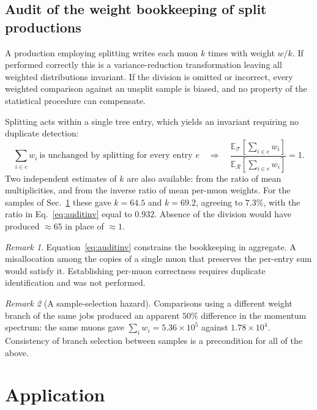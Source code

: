 \documentclass[11pt,a4paper]{article}
\theoremstyle{definition}
\theoremstyle{plain}
\theoremstyle{remark}
\newtheorem{remark}{Remark}[section]
\newcommand{\Rr}{\mathcal{R}}
\newcommand{\Tt}{\mathcal{T}}
\newcommand{\Exp}{\mathbb{E}}
\begin{document}
\subsection{Audit of the weight bookkeeping of split productions}
\label{sec:audit}

A production employing splitting writes each muon $k$ times with weight $w/k$.
If performed correctly this is a variance-reduction transformation leaving all
weighted distributions invariant. If the division is omitted or incorrect, every
weighted comparison against an unsplit sample is biased, and no property of the
statistical procedure can compensate.

Splitting acts within a single tree entry, which yields an invariant requiring
no duplicate detection:
\begin{equation}
  \sum_{i \in e} w_i \ \text{is unchanged by splitting for every entry } e
  \quad\Longrightarrow\quad
  \frac{\Exp_\Tt\!\left[\sum_{i \in e} w_i\right]}
       {\Exp_\Rr\!\left[\sum_{i \in e} w_i\right]} = 1 .
  \label{eq:auditinv}
\end{equation}
Two independent estimates of $k$ are also available: from the ratio of mean
multiplicities, and from the inverse ratio of mean per-muon weights. For the
samples of Sec.~\ref{sec:results} these gave $k = 64.5$ and $k = 69.2$,
agreeing to $7.3\%$, with the ratio in Eq.~\eqref{eq:auditinv} equal to
$0.932$. Absence of the division would have produced $\approx 65$ in place of
$\approx 1$.

\begin{remark}
Equation~\eqref{eq:auditinv} constrains the bookkeeping in aggregate. A
misallocation among the copies of a single muon that preserves the per-entry sum
would satisfy it. Establishing per-muon correctness requires duplicate
identification and was not performed.
\end{remark}

\begin{remark}[A sample-selection hazard]
Comparisons using a different weight branch of the same jobs produced an
apparent $50\%$ difference in the momentum spectrum: the same muons gave
$\sum_i w_i = 5.36\times10^{5}$ against $1.78\times10^{4}$. Consistency of
branch selection between samples is a precondition for all of the above.
\end{remark}

\section{Application}
\label{sec:results}
\end{document}
